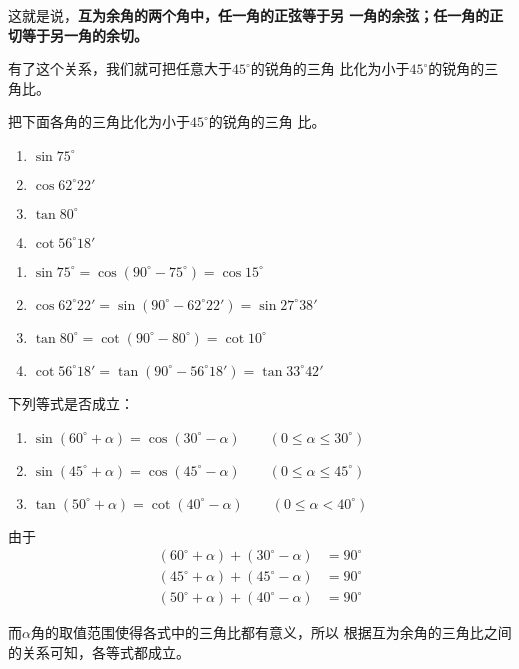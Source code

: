 这就是说，\textbf{互为余角的两个角中，任一角的正弦等于另
一角的余弦；任一角的正切等于另一角的余切。}

有了这个关系，我们就可把任意大于$45^{\circ}$的锐角的三角
比化为小于$45^{\circ}$的锐角的三角比。

\begin{example}
    把下面各角的三角比化为小于$45^{\circ}$的锐角的三角
    比。
\begin{multicols}{2}
\begin{enumerate}
\item $\sin75^{\circ}$
\item $\cos62^{\circ}22'$
\item $\tan 80^{\circ}$
\item $\cot56^{\circ}18'$
\end{enumerate}
\end{multicols}
\end{example}

\begin{solution}
\begin{enumerate}
    \item $\sin75^{\circ}=\cos(90^{\circ}-75^{\circ})=\cos 15^{\circ}$
    \item $\cos62^{\circ}22'=\sin(90^{\circ}-62^{\circ}22')=\sin27^{\circ}38'$
    \item $\tan 80^{\circ}=\cot(90^{\circ}-80^{\circ})=\cot10^{\circ}$
    \item $\cot 56^{\circ}18'=\tan(90^{\circ}-56^{\circ}18')=\tan 33^{\circ}42'$
\end{enumerate}
\end{solution}


\begin{example}
    下列等式是否成立：
\begin{enumerate}
\item $\sin(60^{\circ}+\alpha )=\cos(30^{\circ}-\alpha ) \qquad (0\le \alpha \le 30^{\circ})$
\item $\sin(45^{\circ}+\alpha )=\cos(45^{\circ}-\alpha ) \qquad (0\le \alpha \le 45^{\circ})$
\item $\tan(50^{\circ}+\alpha )=\cot (40^{\circ}-\alpha ) \qquad (0\le \alpha <40^{\circ})$
\end{enumerate}
\end{example}


\begin{solution}
由于
\[\begin{split}
    (60^{\circ}+\alpha )+(30^{\circ}-\alpha )&=90^{\circ}\\
(45^{\circ}+\alpha )+(45^{\circ}-\alpha )&=90^{\circ}\\
(50^{\circ}+\alpha )+(40^{\circ}-\alpha )&=90^{\circ}
\end{split}\]

而$\alpha $角的取值范围使得各式中的三角比都有意义，所以
根据互为余角的三角比之间的关系可知，各等式都成立。
\end{solution}

